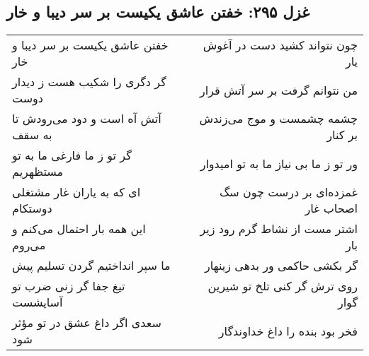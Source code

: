 \begin{center}
\section*{غزل ۲۹۵: خفتن عاشق یکیست بر سر دیبا و خار}
\label{sec:295}
\begin{longtable}{l p{0.5cm} r}
خفتن عاشق یکیست بر سر دیبا و خار
&&
چون نتواند کشید دست در آغوش یار
\\
گر دگری را شکیب هست ز دیدار دوست
&&
من نتوانم گرفت بر سر آتش قرار
\\
آتش آه است و دود می‌رودش تا به سقف
&&
چشمه چشمست و موج می‌زندش بر کنار
\\
گر تو ز ما فارغی ما به تو مستظهریم
&&
ور تو ز ما بی نیاز ما به تو امیدوار
\\
ای که به یاران غار مشتغلی دوستکام
&&
غمزده‌ای بر درست چون سگ اصحاب غار
\\
این همه بار احتمال می‌کنم و می‌روم
&&
اشتر مست از نشاط گرم رود زیر بار
\\
ما سپر انداختیم گردن تسلیم پیش
&&
گر بکشی حاکمی ور بدهی زینهار
\\
تیغ جفا گر زنی ضرب تو آسایشست
&&
روی ترش گر کنی تلخ تو شیرین گوار
\\
سعدی اگر داغ عشق در تو مؤثر شود
&&
فخر بود بنده را داغ خداوندگار
\\
\end{longtable}
\end{center}
